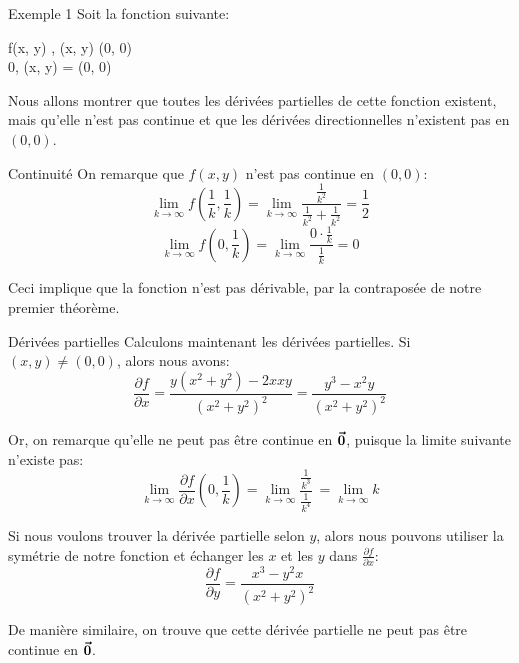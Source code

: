 \documentclass[a4paper]{article}
\begin{document}
\begin{parag}{Exemple 1}
    Soit la fonction suivante:
    \begin{functionbypart}{f\left(x, y\right)}
        , \mathspace \left(x, y\right) \neq \left(0, 0\right) \\
        0, \mathspace \left(x, y\right) = \left(0, 0\right)
    \end{functionbypart}

    Nous allons montrer que toutes les dérivées partielles de cette fonction existent, mais qu'elle n'est pas continue et que les dérivées directionnelles n'existent pas en $\left(0, 0\right)$.

    \begin{subparag}{Continuité}
        On remarque que $f\left(x, y\right)$ n'est pas continue en $\left(0, 0\right)$: 
        \[\lim_{k \to \infty} f\left(\frac{1}{k}, \frac{1}{k}\right) = \lim_{k \to \infty} \frac{\frac{1}{k^2}}{\frac{1}{k^2} + \frac{1}{k^2}} = \frac{1}{2}\]
        \[\lim_{k \to \infty} f\left(0, \frac{1}{k}\right) = \lim_{k \to \infty} \frac{0 \cdot \frac{1}{k}}{\frac{1}{k}} = 0\]

        Ceci implique que la fonction n'est pas dérivable, par la contraposée de notre premier théorème. 
    \end{subparag}
    
    \begin{subparag}{Dérivées partielles}
        Calculons maintenant les dérivées partielles. Si $\left(x, y\right) \neq \left(0, 0\right)$, alors nous avons: 
        \[\frac{\partial f}{\partial x} = \frac{y\left(x^2 + y^2\right) - 2x xy}{\left(x^2 + y^2\right)^2} = \frac{y^3 - x^2 y}{\left(x^2 + y^2\right)^2}\]
        
        Or, on remarque qu'elle ne peut pas être continue en $\bm{\protect\vec{0}}$, puisque la limite suivante n'existe pas:
        \[\lim_{k \to \infty} \frac{\partial f}{\partial x}\left(0, \frac{1}{k}\right) = \lim_{k \to \infty} \frac{\frac{1}{k^3}}{\frac{1}{k^4}}\ = \lim_{k \to \infty} k\]

        Si nous voulons trouver la dérivée partielle selon $y$, alors nous pouvons utiliser la symétrie de notre fonction et échanger les $x$ et les $y$ dans $\frac{\partial f}{\partial x}$: 
        \[\frac{\partial f}{\partial y} = \frac{x^3 - y^2 x}{\left(x^2 + y^2\right)^2}\]

        De manière similaire, on trouve que cette dérivée partielle ne peut pas être continue en $\bm{\protect\vec{0}}$.
    \end{subparag}
    

\end{parag}
\end{document}
